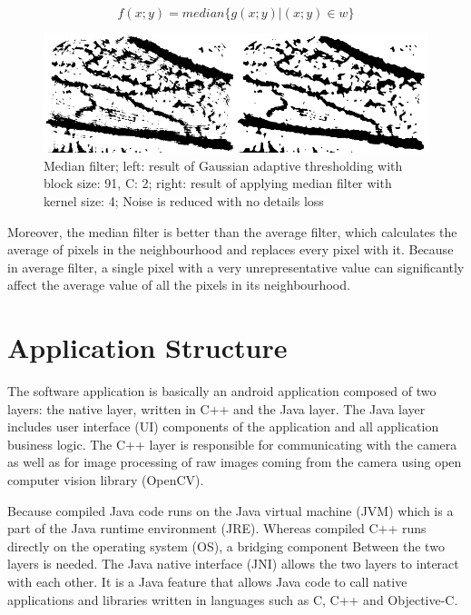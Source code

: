 \begin{equation}
f(x; y) = median \{g(x; y) | (x; y)\in w   \}
\end{equation}


\begin{figure}[H]
\centering
\includegraphics[scale=0.8]{figures/compare5.JPG}
 

\caption[Median filter]{Median filter; left: result of Gaussian adaptive thresholding with block size: 91, C: 2; right: result of applying median filter with kernel size: 4; Noise is reduced with no details loss}\label{fig:compare5}
\end{figure}


Moreover, the median filter is better than the average filter, which calculates the average of pixels in the neighbourhood and replaces every pixel with it. Because in average filter, a single pixel with a very unrepresentative value can significantly affect the average value of all the pixels in its neighbourhood. 


\section{Application Structure}
The software application is basically an android application composed of two layers: the native layer, written in C++ and the Java layer. 
The Java layer includes user interface (UI) components of the application and all application business logic. 
The C++ layer is responsible for communicating with the camera as well as for image processing of raw images coming from the camera using open computer vision library (OpenCV).

Because compiled Java code runs on the Java virtual machine (JVM) which is a part of the Java runtime environment (JRE). Whereas compiled C++ runs directly on the operating system (OS), a bridging component Between the two layers is needed.
The Java native interface (JNI) allows the two layers to interact with each other. It is a Java feature that allows Java code to call native applications and libraries written in languages such as C, C++ and Objective-C.

